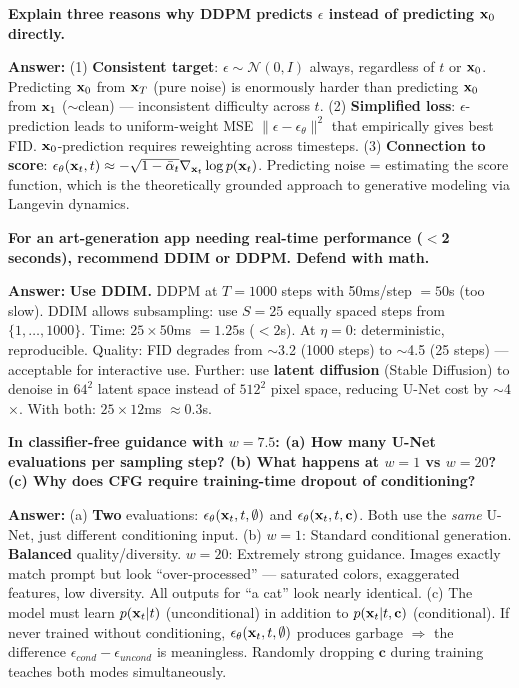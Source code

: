\begin{examq}
\textbf{Explain three reasons why DDPM predicts $\epsilon$ instead of predicting $\mathbf{x}_0$ directly.}

\textbf{Answer:} (1) \textbf{Consistent target}: $\epsilon \sim \mathcal{N}(0,I)$ always, regardless of $t$ or $\mathbf{x}_0$. Predicting $\mathbf{x}_0$ from $\mathbf{x}_T$ (pure noise) is enormously harder than predicting $\mathbf{x}_0$ from $\mathbf{x}_1$ ($\sim$clean) — inconsistent difficulty across $t$. (2) \textbf{Simplified loss}: $\epsilon$-prediction leads to uniform-weight MSE $\|\epsilon - \epsilon_\theta\|^2$ that empirically gives best FID. $\mathbf{x}_0$-prediction requires reweighting across timesteps. (3) \textbf{Connection to score}: $\epsilon_\theta(\mathbf{x}_t,t) \approx -\sqrt{1-\bar\alpha_t}\nabla_{\mathbf{x}_t}\log p(\mathbf{x}_t)$. Predicting noise = estimating the score function, which is the theoretically grounded approach to generative modeling via Langevin dynamics.
\end{examq}

\begin{examq}
\textbf{For an art-generation app needing real-time performance ($<$2 seconds), recommend DDIM or DDPM. Defend with math.}

\textbf{Answer:} \textbf{Use DDIM.} DDPM at $T = 1000$ steps with 50ms/step $= 50$s (too slow). DDIM allows subsampling: use $S = 25$ equally spaced steps from $\{1, \ldots, 1000\}$. Time: $25 \times 50$ms $= 1.25$s ($< 2$s). At $\eta = 0$: deterministic, reproducible. Quality: FID degrades from $\sim$3.2 (1000 steps) to $\sim$4.5 (25 steps) — acceptable for interactive use. Further: use \textbf{latent diffusion} (Stable Diffusion) to denoise in $64^2$ latent space instead of $512^2$ pixel space, reducing U-Net cost by $\sim$4$\times$. With both: $25 \times 12$ms $\approx 0.3$s.
\end{examq}

\begin{examq}
\textbf{In classifier-free guidance with $w = 7.5$: (a) How many U-Net evaluations per sampling step? (b) What happens at $w = 1$ vs $w = 20$? (c) Why does CFG require training-time dropout of conditioning?}

\textbf{Answer:} (a) \textbf{Two} evaluations: $\epsilon_\theta(\mathbf{x}_t, t, \emptyset)$ and $\epsilon_\theta(\mathbf{x}_t, t, \mathbf{c})$. Both use the \textit{same} U-Net, just different conditioning input. (b) $w = 1$: Standard conditional generation. \textbf{Balanced} quality/diversity. $w = 20$: Extremely strong guidance. Images exactly match prompt but look ``over-processed'' — saturated colors, exaggerated features, low diversity. All outputs for ``a cat'' look nearly identical. (c) The model must learn $p(\mathbf{x}_t|t)$ (unconditional) in addition to $p(\mathbf{x}_t|t, \mathbf{c})$ (conditional). If never trained without conditioning, $\epsilon_\theta(\mathbf{x}_t, t, \emptyset)$ produces garbage $\Rightarrow$ the difference $\epsilon_{cond} - \epsilon_{uncond}$ is meaningless. Randomly dropping $\mathbf{c}$ during training teaches both modes simultaneously.
\end{examq}

